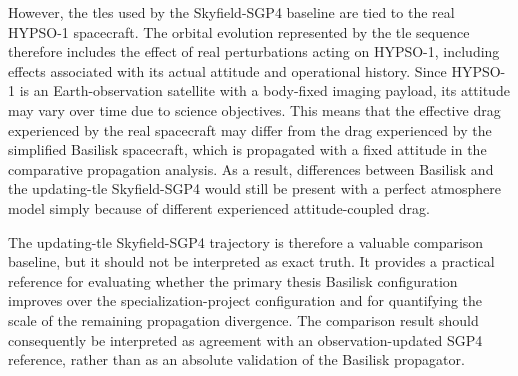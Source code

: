 However, the \glspl{tle} used by the Skyfield-SGP4 baseline are tied to the real HYPSO-1 spacecraft. The orbital evolution represented by the \gls{tle} sequence therefore includes the effect of real perturbations acting on HYPSO-1, including effects associated with its actual attitude and operational history. Since HYPSO-1 is an Earth-observation satellite with a body-fixed imaging payload, its attitude may vary over time due to science objectives. This means that the effective drag experienced by the real spacecraft may differ from the drag experienced by the simplified Basilisk spacecraft, which is propagated with a fixed attitude in the comparative propagation analysis. As a result, differences between Basilisk and the updating-\gls{tle} Skyfield-SGP4 would still be present with a perfect atmosphere model simply because of different experienced attitude-coupled drag.

The updating-\gls{tle} Skyfield-SGP4 trajectory is therefore a valuable comparison baseline, but it should not be interpreted as exact truth. It provides a practical reference for evaluating whether the primary thesis Basilisk configuration improves over the specialization-project configuration and for quantifying the scale of the remaining propagation divergence. The comparison result should consequently be interpreted as agreement with an observation-updated SGP4 reference, rather than as an absolute validation of the Basilisk propagator.

